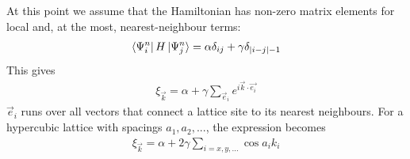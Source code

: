 \documentclass[12pt]{article}
\numberwithin{equation}{section}
\begin{document}
At this point we assume that the Hamiltonian has non-zero matrix elements for local and, at the most, nearest-neighbour terms:
\begin{equation}\begin{aligned}
	\bra{\Psi^n_i}H\ket{\Psi^n_j} = \alpha \delta_{ij} + \gamma \delta_{|i-j| - 1}
\end{aligned}\end{equation}
This gives
\begin{equation}\begin{aligned}
	\xi_{\vec k} = \alpha + \gamma\sum_{\vec e_i}e^{i \vec{ k}\cdot\vec{ e_i}}
\end{aligned}\end{equation}
\(\vec e_i\) runs over all vectors that connect a lattice site to its nearest neighbours. For a hypercubic lattice with spacings \(a_1, a_2, ...\), the expression becomes
\begin{equation}\begin{aligned}
	\xi_{\vec k} = \alpha + 2\gamma\sum_{i=x,y,...}\cos a_i k_i
\end{aligned}\end{equation}
\newpage
\end{document}
